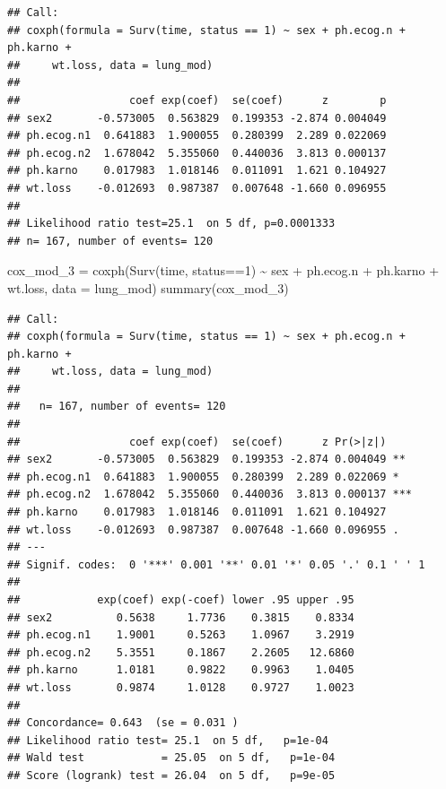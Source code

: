 \documentclass[
]{article}
\newenvironment{Shaded}{\begin{snugshade}}{\end{snugshade}}
\newcommand{\AttributeTok}[1]{\textcolor[rgb]{0.77,0.63,0.00}{#1}}
\newcommand{\DecValTok}[1]{\textcolor[rgb]{0.00,0.00,0.81}{#1}}
\newcommand{\FunctionTok}[1]{\textcolor[rgb]{0.00,0.00,0.00}{#1}}
\newcommand{\NormalTok}[1]{#1}
\newcommand{\OtherTok}[1]{\textcolor[rgb]{0.56,0.35,0.01}{#1}}
\newcommand{\SpecialCharTok}[1]{\textcolor[rgb]{0.00,0.00,0.00}{#1}}
\begin{document}
\begin{verbatim}
## Call:
## coxph(formula = Surv(time, status == 1) ~ sex + ph.ecog.n + ph.karno + 
##     wt.loss, data = lung_mod)
## 
##                 coef exp(coef)  se(coef)      z        p
## sex2       -0.573005  0.563829  0.199353 -2.874 0.004049
## ph.ecog.n1  0.641883  1.900055  0.280399  2.289 0.022069
## ph.ecog.n2  1.678042  5.355060  0.440036  3.813 0.000137
## ph.karno    0.017983  1.018146  0.011091  1.621 0.104927
## wt.loss    -0.012693  0.987387  0.007648 -1.660 0.096955
## 
## Likelihood ratio test=25.1  on 5 df, p=0.0001333
## n= 167, number of events= 120
\end{verbatim}

\begin{Shaded}
\begin{Highlighting}[]
\NormalTok{cox\_mod\_3 }\OtherTok{=} \FunctionTok{coxph}\NormalTok{(}\FunctionTok{Surv}\NormalTok{(time, status}\SpecialCharTok{==}\DecValTok{1}\NormalTok{) }\SpecialCharTok{\textasciitilde{}}\NormalTok{ sex }\SpecialCharTok{+}\NormalTok{ ph.ecog.n }\SpecialCharTok{+}\NormalTok{ ph.karno }\SpecialCharTok{+}\NormalTok{ wt.loss, }\AttributeTok{data =}\NormalTok{ lung\_mod)}
\FunctionTok{summary}\NormalTok{(cox\_mod\_3)}
\end{Highlighting}
\end{Shaded}

\begin{verbatim}
## Call:
## coxph(formula = Surv(time, status == 1) ~ sex + ph.ecog.n + ph.karno + 
##     wt.loss, data = lung_mod)
## 
##   n= 167, number of events= 120 
## 
##                 coef exp(coef)  se(coef)      z Pr(>|z|)    
## sex2       -0.573005  0.563829  0.199353 -2.874 0.004049 ** 
## ph.ecog.n1  0.641883  1.900055  0.280399  2.289 0.022069 *  
## ph.ecog.n2  1.678042  5.355060  0.440036  3.813 0.000137 ***
## ph.karno    0.017983  1.018146  0.011091  1.621 0.104927    
## wt.loss    -0.012693  0.987387  0.007648 -1.660 0.096955 .  
## ---
## Signif. codes:  0 '***' 0.001 '**' 0.01 '*' 0.05 '.' 0.1 ' ' 1
## 
##            exp(coef) exp(-coef) lower .95 upper .95
## sex2          0.5638     1.7736    0.3815    0.8334
## ph.ecog.n1    1.9001     0.5263    1.0967    3.2919
## ph.ecog.n2    5.3551     0.1867    2.2605   12.6860
## ph.karno      1.0181     0.9822    0.9963    1.0405
## wt.loss       0.9874     1.0128    0.9727    1.0023
## 
## Concordance= 0.643  (se = 0.031 )
## Likelihood ratio test= 25.1  on 5 df,   p=1e-04
## Wald test            = 25.05  on 5 df,   p=1e-04
## Score (logrank) test = 26.04  on 5 df,   p=9e-05
\end{verbatim}
\end{document}
